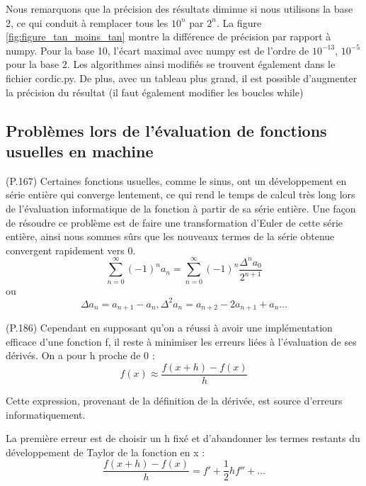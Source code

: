 \documentclass{article}
\def\cordicPythonFile{cordic.py}
\begin{document}
Nous remarquons que la précision des résultats diminue si nous utilisons la base 2, ce qui conduit à remplacer tous les $10^n$ par $2^n$. La figure \ref{fig:figure_tan_moins_tan} montre la différence de précision par rapport à numpy. Pour la base 10, l'écart maximal avec numpy est de l'ordre de $10^{-13}$, $10^{-5}$ pour la base 2. Les algorithmes ainsi modifiés se trouvent également dans le fichier \cordicPythonFile. De plus, avec un tableau plus grand, il est possible d'augmenter la précision du résultat (il faut également modifier les boucles while)

\subsection*{Problèmes lors de l’évaluation de fonctions usuelles en machine}

(P.167) Certaines fonctions usuelles, comme le sinus, ont un développement en série entière qui converge lentement, ce qui rend le temps de calcul très long lors de l'évaluation informatique de la fonction à partir de sa série entière. Une façon de résoudre ce problème est de faire une transformation d'Euler de cette série entière, ainsi nous sommes sûrs que les nouveaux termes de la série obtenue convergent rapidement vers 0.\\
\begin{equation}
    \sum_{n=0}^\infty (-1)^n a_n = \sum_{n=0}^\infty (-1)^n \frac {\Delta^n a_0} {2^{n+1}}
    \label{eq:Euler_Transfo}
\end{equation}
ou
\begin{equation}
    \Delta a_n=a_{n+1}-a_n,\Delta^2 a_n=a_{n+2}-2a_{n+1}+a_n \dots
    \label{eq:Euler_Transfo_2}
\end{equation}

(P.186) Cependant en supposant  qu'on a réussi à avoir une implémentation efficace d'une fonction f, il reste à minimiser les erreurs liées à l'évaluation de ses dérivés. On a pour h proche de 0 : 
\begin{equation}
    f(x)\approx\frac{f(x+h)-f(x)}{h}
    \label{eq:derivee}
\end{equation}

Cette expression, provenant de la définition de la dérivée, est source d'erreurs informatiquement.

La première erreur est de choisir un h fixé et d’abandonner les termes restants du développement de Taylor de la fonction en x :
\begin{equation}
    \frac{f(x+h)-f(x)}{h}=f'+\frac{1}{2}hf''+ \dots
    \label{eq:developpement_de_Taylor}
\end{equation}
\end{document}
